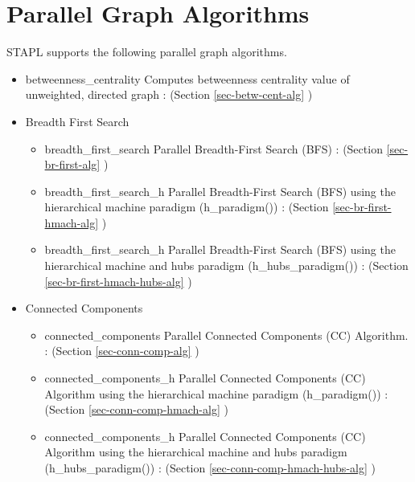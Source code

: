 \chapter{Parallel Graph Algorithms}

STAPL supports the following parallel graph algorithms.


\begin{itemize}
\item
betweenness\_centrality 
\newline
Computes betweenness centrality value of unweighted, directed graph
 : (Section \ref{sec-betw-cent-alg} )

\item
Breadth First Search
\begin{itemize}
\item
breadth\_first\_search 
\newline
Parallel Breadth-First Search (BFS) 
 : (Section \ref{sec-br-first-alg} )
\item
breadth\_first\_search\_h 
\newline
Parallel Breadth-First Search (BFS) using the hierarchical machine paradigm (h\_paradigm())
 : (Section \ref{sec-br-first-hmach-alg} )
\item
breadth\_first\_search\_h 
\newline
Parallel Breadth-First Search (BFS) using the hierarchical machine and hubs paradigm (h\_hubs\_paradigm())
 : (Section \ref{sec-br-first-hmach-hubs-alg} )
\end{itemize}

\item
Connected Components
\begin{itemize}
\item
connected\_components 
\newline
Parallel Connected Components (CC) Algorithm. 
 : (Section \ref{sec-conn-comp-alg} )
\item
connected\_components\_h 
\newline
Parallel Connected Components (CC) Algorithm using the hierarchical machine paradigm (h\_paradigm())
 : (Section \ref{sec-conn-comp-hmach-alg} )
\item
connected\_components\_h 
\newline
Parallel Connected Components (CC) Algorithm using the hierarchical machine and hubs paradigm (h\_hubs\_paradigm())
 : (Section \ref{sec-conn-comp-hmach-hubs-alg} ) 
\end{itemize}


\end{itemize}
